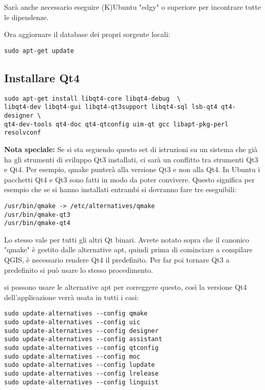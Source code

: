 Sarà anche necessario eseguire (K)Ubuntu "edgy" o superiore per incontrare tutte le dipendenze.

Ora aggiornare il  database dei propri sorgente locali:

\begin{verbatim}
sudo apt-get update 
\end{verbatim}

\subsection{Installare Qt4}
\begin{verbatim}
sudo apt-get install libqt4-core libqt4-debug  \
libqt4-dev libqt4-gui libqt4-qt3support libqt4-sql lsb-qt4 qt4-designer \
qt4-dev-tools qt4-doc qt4-qtconfig uim-qt gcc libapt-pkg-perl resolvconf
\end{verbatim}

\textbf{Nota speciale:} Se si sta seguendo questo set di istruzioni su un sistema che già ha gli strumenti di sviluppo Qt3 installati, ci sarà un conflitto tra strumenti Qt3 e Qt4. Per esempio, qmake punterà alla versione Qt3 e non alla Qt4. In Ubuntu i pacchetti Qt4 e Qt3 sono fatti in modo da poter convivere. Questo significa per esempio che se si hanno installati entrambi si dovranno fare tre eseguibili:

\begin{verbatim}
/usr/bin/qmake -> /etc/alternatives/qmake 
/usr/bin/qmake-qt3
/usr/bin/qmake-qt4 
\end{verbatim}

Lo stesso vale per tutti gli altri Qt binari. Avrete notato sopra che il canonico "qmake" è gestito dalle alternative apt, quindi prima di cominciare a compilare QGIS, è necessario rendere Qt4 il predefinito. Per far poi tornare Qt3 a predefinito si può usare lo stesso procedimento.

si possono usare le alternative apt per correggere questo, così la versione Qt4 dell'applicazione verrà usata in tutti i casi:

\begin{verbatim}
sudo update-alternatives --config qmake
sudo update-alternatives --config uic 
sudo update-alternatives --config designer 
sudo update-alternatives --config assistant 
sudo update-alternatives --config qtconfig 
sudo update-alternatives --config moc 
sudo update-alternatives --config lupdate 
sudo update-alternatives --config lrelease 
sudo update-alternatives --config linguist 
\end{verbatim}

